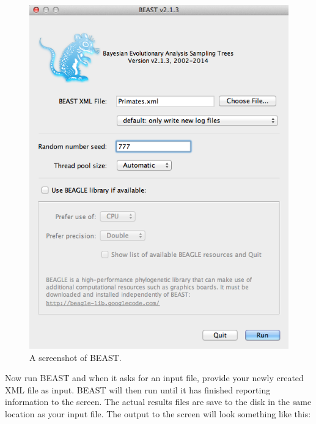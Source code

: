 \documentclass[11pt]{article}
\theoremstyle{plain}%
\theoremstyle{definition}
\theoremstyle{remark}
\begin{document}
\begin{figure}
\includegraphics[width=\textwidth]{figures/BEAST}
\caption{A screenshot of BEAST.}
\label{fig:BEAST}
\end{figure}

Now run BEAST and when it asks for an input file, provide your newly
created XML file as input. BEAST will then run until it has finished
reporting information to the screen. The actual results files are
save to the disk in the same location as your input file. The output to the screen will
look something like this: 
\end{document}
